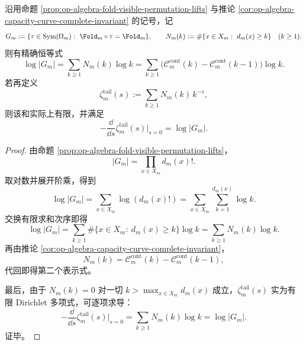 \begin{theorem}\label{thm:op-algebra-fold-gauge-log-volume-stieltjes}
沿用命题 \ref{prop:op-algebra-fold-visible-permutation-lifts} 与推论 \ref{cor:op-algebra-capacity-curve-complete-invariant} 的记号，记
\[
G_m:=\{\tau\in\mathrm{Sym}(\Omega_m):\ \Fold_m\circ\tau=\Fold_m\},
\qquad
N_m(k):=\#\{x\in X_m:\ d_m(x)\ge k\}\quad(k\ge 1).
\]
则有精确恒等式
\[
\log|G_m|
=
\sum_{k\ge 1}N_m(k)\log k
=
\sum_{k\ge 1}\bigl(\mathcal C_m^{\mathrm{cont}}(k)-\mathcal C_m^{\mathrm{cont}}(k-1)\bigr)\log k.
\]
若再定义
\[
\zeta_m^{\mathrm{tail}}(s):=\sum_{k\ge 1}N_m(k)\,k^{-s},
\]
则该和实际上有限，并满足
\[
-\frac{\dd}{\dd s}\zeta_m^{\mathrm{tail}}(s)\Big|_{s=0}=\log|G_m|.
\]
\end{theorem}
\begin{proof}
由命题 \ref{prop:op-algebra-fold-visible-permutation-lifts}，
\[
|G_m|=\prod_{x\in X_m}d_m(x)!.
\]
取对数并展开阶乘，得到
\[
\log|G_m|
=
\sum_{x\in X_m}\log(d_m(x)!)
=
\sum_{x\in X_m}\sum_{k=1}^{d_m(x)}\log k.
\]
交换有限求和次序即得
\[
\log|G_m|
=
\sum_{k\ge 1}\#\{x\in X_m:\ d_m(x)\ge k\}\log k
=
\sum_{k\ge 1}N_m(k)\log k.
\]
再由推论 \ref{cor:op-algebra-capacity-curve-complete-invariant}，
\[
N_m(k)=\mathcal C_m^{\mathrm{cont}}(k)-\mathcal C_m^{\mathrm{cont}}(k-1),
\]
代回即得第二个表示式。

最后，由于 \(N_m(k)=0\) 对一切 \(k>\max_{x\in X_m}d_m(x)\) 成立，\(\zeta_m^{\mathrm{tail}}(s)\) 实为有限 Dirichlet 多项式，可逐项求导：
\[
-\frac{\dd}{\dd s}\zeta_m^{\mathrm{tail}}(s)\Big|_{s=0}
=
\sum_{k\ge 1}N_m(k)\log k
=
\log|G_m|.
\]
证毕。
\end{proof}
